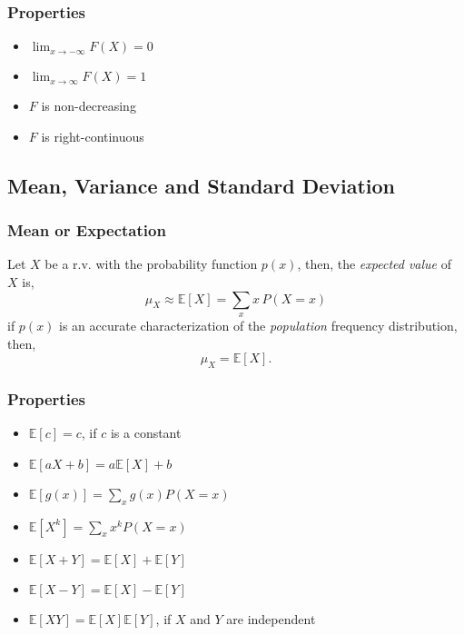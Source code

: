 \subsubsection{Properties} %
\label{ssub:properties02}


\begin{itemize}
    \item $\lim_{x \rightarrow -\infty} F(X) = 0$
    \item $\lim_{x \rightarrow \infty} F(X) = 1$
    \item $F$ is non-decreasing
    \item $F$ is right-continuous
\end{itemize}

\subsection{Mean, Variance and Standard Deviation} %
\label{sub:mean_variance_and_standard_deviation}

\subsubsection{Mean or Expectation} %
\label{ssub:mean_or_expectation}

Let $X$ be a r.v. with the probability function $p(x)$, then, the
\emph{expected value} of $X$ is,
\begin{equation*}
    \mu_{X} \approx \mathbb{E}[X] = \sum_{x} x\,P(X=x)
\end{equation*}
if $p(x)$ is an accurate characterization of the \emph{population} frequency
distribution, then,
\begin{equation*}
    \mu_{X} = \mathbb{E}[X].
\end{equation*}

\subsubsection{Properties} %
\label{ssub:properties03}

\begin{itemize}
    \item $\mathbb{E}[c] = c$, if $c$ is a constant
    \item $\mathbb{E}[aX+b]= a\mathbb{E}[X]+b$
    \item $\mathbb{E}[g(x)]= \sum_{x}g(x)P(X=x)$
    \item $\mathbb{E}[X^k] = \sum_{x} x^k P(X=x)$
    \item $\mathbb{E}[X+Y] = \mathbb{E}[X] + \mathbb{E}[Y]$
    \item $\mathbb{E}[X-Y] = \mathbb{E}[X] - \mathbb{E}[Y]$
    \item $\mathbb{E}[XY] = \mathbb{E}[X]\mathbb{E}[Y]$, if $X$ and $Y$ are
    independent
\end{itemize}


